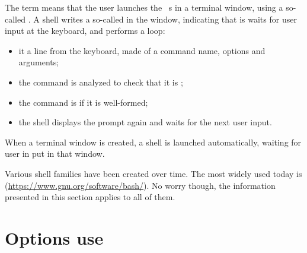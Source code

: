 The term {\it \CLI} means that the user launches the \mf\ \service s in a terminal window, using a so-called . A shell writes a so-called  in the window, indicating that is waits for user input at the keyboard, and performs a loop:
\begin{itemize}
\item it  a line from the keyboard, made of a command name, options and arguments;
\item the command is analyzed to check that it is ;
\item the command is  if it is well-formed;
\item the shell displays the prompt again and waits for the next user input.
\end{itemize}

When a terminal window is created, a shell is launched automatically, waiting for user in put in that window.

Various shell families have been created over time. The most widely used today is  (\url{https://www.gnu.org/software/bash/}). No worry though, the information presented in this section applies to all of them.


\chapter{Options use}

